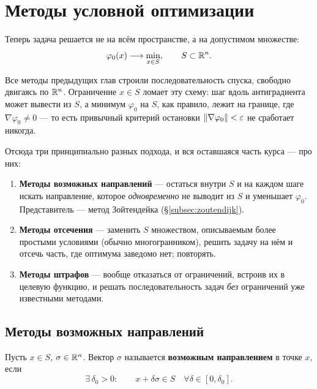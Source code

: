 \section{Методы условной оптимизации}

Теперь задача решается не на всём пространстве, а на допустимом множестве:
\[
  \varphi_0(x) \longrightarrow \min_{x \in S} ,
  \qquad S \subset \mathbb{R}^n .
\]

\begin{idea}[title={Общая картина: зачем вообще нужны отдельные методы}]
Все методы предыдущих глав строили последовательность спуска, свободно двигаясь
по $\mathbb{R}^n$. Ограничение $x \in S$ ломает эту схему: шаг вдоль антиградиента может
вывести из $S$, а минимум $\varphi_0$ на $S$, как правило, лежит на границе,
где $\nabla\varphi_0 \ne 0$ — то есть привычный критерий остановки
$\left\lVert \nabla \varphi_0 \right\rVert < \varepsilon$ не сработает никогда.

Отсюда три принципиально разных подхода, и вся оставшаяся часть курса — про них:
\begin{enumerate}[label=\arabic*.,left=0pt,itemsep=3pt]
  \item \textbf{Методы возможных направлений} — остаться внутри $S$ и на каждом
        шаге искать направление, которое \emph{одновременно} не выводит из $S$ и
        уменьшает $\varphi_0$. Представитель — метод Зойтендейка
        (\S\ref{subsec:zoutendijk}).
  \item \textbf{Методы отсечения} — заменить $S$ множеством, описываемым более
        простыми условиями (обычно многогранником), решить задачу на нём и
        отсечь часть, где оптимума заведомо нет; повторять.
  \item \textbf{Методы штрафов} — вообще отказаться от ограничений, встроив их
        в целевую функцию, и решать последовательность задач \emph{без}
        ограничений уже известными методами.
\end{enumerate}
\end{idea}

\subsection{Методы возможных направлений}

\begin{definition}\label{def:feasible-direction}
Пусть $x \in S$, $\sigma \in \mathbb{R}^n$. Вектор $\sigma$ называется
\textbf{возможным направлением} в точке $x$, если
\[
  \exists\, \delta_0 > 0 : \qquad x + \delta\sigma \in S
  \quad \forall \delta \in [0, \delta_0] .
\]
\end{definition}

